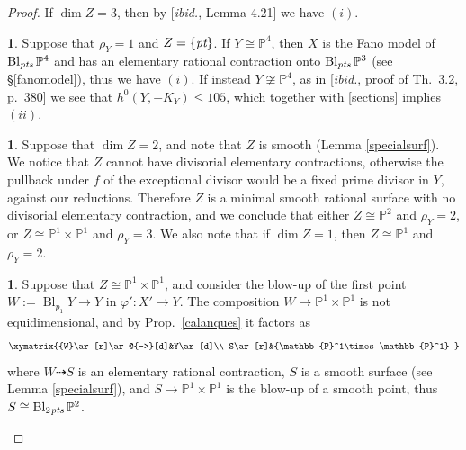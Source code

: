 \documentclass[a4paper,12pt]{amsart}
\theoremstyle{definition}
\newtheorem{prg}[thm]{}
\numberwithin{figure}{section}
\numberwithin{table}{section}
\newcommand{\ph}{\varphi}
\newcommand{\pr}{\mathbb{P}}
\newcommand{\Bl}{\operatorname{Bl}}
\newcommand{\pt}{\text{\it pt}}
\newcommand{\pts}{\text{\it pts}}
\begin{document}
\begin{proof}
   If $\dim Z=3$, then by [\emph{ibid.}, Lemma 4.21] we have $(i)$.
    \begin{prg}\label{rhoY1}
      Suppose that $\rho_Y=1$ and $Z=\{\pt\}$.
      If $Y\cong\pr^4$,
      then  $X$ is the Fano model of $\Bl_{\pts}\pr^4$ and has an elementary rational contraction onto $\Bl_{\pts}\pr^3$ (see \S\ref{fanomodel}), thus we have $(i)$.
      If instead $Y\not\cong\pr^4$, 
 as in [\emph{ibid.}, proof of Th.~3.2, p.~380] we see that $h^0(Y,-K_Y)\leq 105$, which together with \eqref{sections} implies $(ii)$.
\end{prg}
  \begin{prg}\label{dimZ2}
   Suppose that $\dim Z=2$, and note that $Z$ is smooth (Lemma \ref{specialsurf}).   
    We notice that
    $Z$ cannot have divisorial  elementary contractions, otherwise the pullback under $f$ of the exceptional divisor would be a fixed prime divisor in $Y$, against our reductions.
Therefore $Z$ is a minimal smooth rational surface  with no 
divisorial elementary contraction, and we conclude that either $Z\cong\pr^2$ and $\rho_Y=2$, or $Z\cong\pr^1\times\pr^1$ and $\rho_Y=3$. We also note that if $\dim Z=1$, then $Z\cong\pr^1$ and $\rho_Y=2$.
\end{prg}
  \begin{prg}\label{avocado}
   Suppose that $Z\cong\pr^1\times\pr^1$, and consider the blow-up
of the first point $W:=\Bl_{p_1}Y\to Y$ in $\ph'\colon X'\to Y$. The composition $W\to\pr^1\times\pr^1$ is not equidimensional, and by Prop.~\ref{calanques} it factors as
    $$\xymatrix{{W}\ar[r]\ar@{-->}[d]&Y\ar[d]\\
     S\ar[r]&{\pr^1\times\pr^1}
    }$$
    where $W\dasharrow S$ is an elementary rational contraction, $S$ is a smooth surface (see Lemma \ref{specialsurf}), and $S\to\pr^1\times\pr^1$ is the blow-up of a smooth point, thus $S\cong\Bl_{2\mskip1mu\pts}\pr^2$.


\end{prg}
\end{proof}
\end{document}
